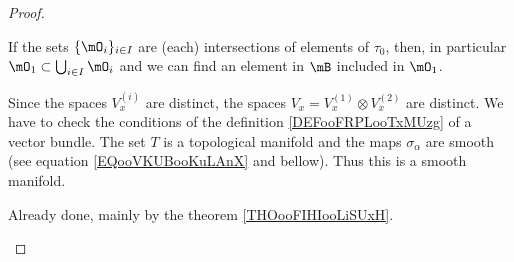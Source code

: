 \begin{proof}
\begin{subproof}
\begin{subproof}
			\spitem[Union]

			If the sets \( \{ \mO_i \}_{i\in I}\) are (each) intersections of elements of \( \tau_0\), then, in particular \( \mO_1\subset \bigcup_{i\in I}\mO_i\) and we can find an element in \( \mB\) included in \( \mO_1\).

		\end{subproof}
	\end{subproof}

	Since the spaces \( V^{(i)}_x\) are distinct, the spaces \( V_x=V_x^{(1)}\otimes V_x^{(2)}\) are distinct. We have to check the conditions of the definition \ref{DEFooFRPLooTxMUzg} of a vector bundle. The set \( T\) is a topological manifold and the maps \( \sigma_{\alpha}\) are smooth (see equation \eqref{EQooVKUBooKuLAnX} and bellow). Thus this is a smooth manifold.

	\begin{subproof}


		Already done, mainly by the theorem \ref{THOooFIHIooLiSUxH}.




\end{subproof}
\end{proof}
